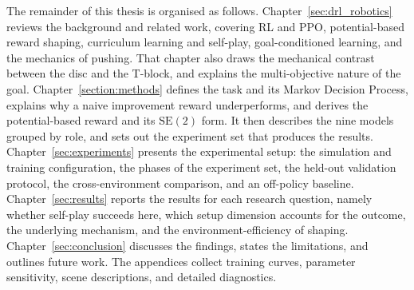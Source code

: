 The remainder of this thesis is organised as follows.
Chapter~\ref{sec:drl_robotics} reviews the background and related work, covering
RL and PPO, potential-based reward shaping, curriculum learning and self-play,
goal-conditioned learning, and the mechanics of pushing. That chapter also draws
the mechanical contrast between the disc and the T-block, and explains the
multi-objective nature of the goal. Chapter~\ref{section:methods} defines the task
and its Markov Decision Process, explains why a naive improvement reward
underperforms, and derives the potential-based reward and its $\mathrm{SE}(2)$
form. It then describes the nine models grouped by role, and sets out the
experiment set that produces the results. Chapter~\ref{sec:experiments} presents
the experimental setup: the simulation and training configuration, the phases of
the experiment set, the held-out validation protocol, the cross-environment
comparison, and an off-policy baseline. Chapter~\ref{sec:results} reports the
results for each research question, namely whether self-play succeeds here, which
setup dimension accounts for the outcome, the underlying mechanism, and the
environment-efficiency of shaping. Chapter~\ref{sec:conclusion} discusses the
findings, states the limitations, and outlines future work. The appendices collect
training curves, parameter sensitivity, scene descriptions, and detailed
diagnostics.
